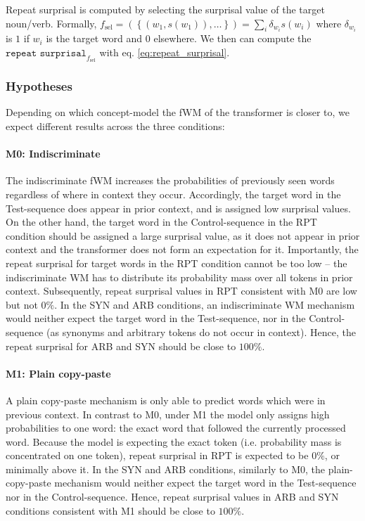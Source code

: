 Repeat surprisal is computed by selecting the surprisal value of the target noun/verb. Formally, $f_\text{sel} = \left(\left\{\left(w_1, s(w_1)\right), \dots \right\}\right) = \sum_i \delta_{w_i} s(w_i)$ where $\delta_{w_i}$ is $1$ if $w_i$ is the target word and $0$ elsewhere. We then can compute the $\texttt{repeat surprisal}_{f_\text{sel}}$ with eq. \ref{eq:repeat_surprisal}.

\subsubsection{Hypotheses} \label{sec:expectations}
Depending on which concept-model the fWM of the transformer is closer to, we expect different results across the three conditions:


\paragraph{M0: Indiscriminate}

The indiscriminate fWM increases the probabilities of previously seen words regardless of where in context they occur.
Accordingly, the target word in the Test-sequence does appear in prior context, and is assigned low surprisal values.
On the other hand, the target word in the Control-sequence in the RPT condition should be assigned a large surprisal value, as it does not appear in prior context and the transformer does not form an expectation for it.
Importantly, the repeat surprisal for target words in the RPT condition cannot be too low -- the indiscriminate WM has to distribute its probability mass over all tokens in prior context.
Subsequently, repeat surprisal values in RPT consistent with M0 are low but not $0\%$.
In the SYN and ARB conditions, an indiscriminate WM mechanism would neither expect the target word in the Test-sequence, nor in the Control-sequence (as synonyms and arbitrary tokens do not occur in context).
Hence, the repeat surprisal for ARB and SYN should be close to $100\%$.

\paragraph{M1: Plain copy-paste}
A plain copy-paste mechanism is only able to predict words which were in previous context.
In contrast to M0, under M1 the model only assigns high probabilities to one word: the exact word that followed the currently processed word.
Because the model is expecting the exact token (i.e. probability mass is concentrated on one token), repeat surprisal in RPT is expected to be $0\%$, or minimally above it.
In the SYN and ARB conditions, similarly to M0, the plain-copy-paste mechanism would neither expect the target word in the Test-sequence nor in the Control-sequence.
Hence, repeat surprisal values in ARB and SYN conditions consistent with M1 should be close to $100\%$.

